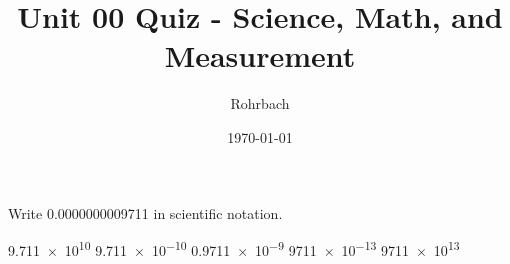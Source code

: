 \documentclass[10pt]{exam}
\title{Unit 00 Quiz - Science, Math, and Measurement}
\author{Rohrbach}
\date{\today}
\begin{document}
\maketitle

\begin{questions}
  \question
    Write \SI{0.0000000009711}{} in scientific notation.

    \begin{choices}
      \choice \SI{9.711e10}{}
      \choice \SI{9.711e-10}{}
      \choice \SI{.9711e-9}{}
      \choice \SI{9711e-13}{}
      \choice \SI{9711e13}{}
    \end{choices}
\end{questions}
\end{document}
